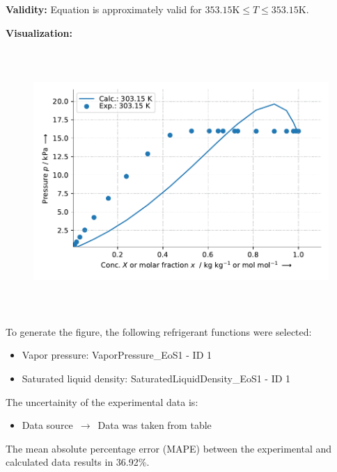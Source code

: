 \textbf{Validity:}
\newline
Equation is approximately valid for $353.15 \si{\kelvin} \leq T \leq 353.15 \si{\kelvin}$.
\newline

\textbf{Visualization:}
%
\begin{figure}[!htp]
{\noindent\includegraphics[height=10cm, keepaspectratio]{figs/abs/abs_Benzene_inoic_liquid_[EMIM]+[C2H5OSO3]-_NrtlTemperatureDg_1.pdf}}
\end{figure}
%

To generate the figure, the following refrigerant functions were selected:
\begin{itemize}
\item Vapor pressure: VaporPressure\_EoS1 - ID 1
\item Saturated liquid density: SaturatedLiquidDensity\_EoS1 - ID 1
\end{itemize}

The uncertainity of the experimental data is:
\begin{itemize}
\item Data source $\,\to\,$ Data was taken from table
\end{itemize}

The mean absolute percentage error (MAPE) between the experimental and calculated data results in 36.92\%.
\FloatBarrier
\newpage
